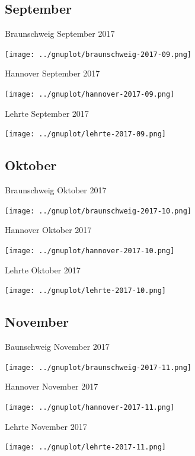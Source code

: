 \documentclass[aspectratio=169]{beamer} %
\begin{document}
\subsection{September}
\begin{frame}{Braunschweig September 2017}
  \begin{center}
    \texttt{[image: ../gnuplot/braunschweig-2017-09.png]}
  \end{center}
\end{frame}
\begin{frame}{Hannover September 2017}
  \begin{center}
    \texttt{[image: ../gnuplot/hannover-2017-09.png]}
  \end{center}
\end{frame}
\begin{frame}{Lehrte September 2017}
  \begin{center}
    \texttt{[image: ../gnuplot/lehrte-2017-09.png]}
  \end{center}
\end{frame}

\subsection{Oktober}
\begin{frame}{Braunschweig Oktober 2017}
  \begin{center}
    \texttt{[image: ../gnuplot/braunschweig-2017-10.png]}
  \end{center}
\end{frame}
\begin{frame}{Hannover Oktober 2017}
  \begin{center}
    \texttt{[image: ../gnuplot/hannover-2017-10.png]}
  \end{center}
\end{frame}
\begin{frame}{Lehrte Oktober 2017}
  \begin{center}
    \texttt{[image: ../gnuplot/lehrte-2017-10.png]}
  \end{center}
\end{frame}

\subsection{November}
\begin{frame}{Baunschweig November 2017}
  \begin{center}
    \texttt{[image: ../gnuplot/braunschweig-2017-11.png]}
  \end{center}
\end{frame}
\begin{frame}{Hannover November 2017}
  \begin{center}
    \texttt{[image: ../gnuplot/hannover-2017-11.png]}
  \end{center}
\end{frame}
\begin{frame}{Lehrte November 2017}
  \begin{center}
    \texttt{[image: ../gnuplot/lehrte-2017-11.png]}
  \end{center}
\end{frame}
\end{document}

